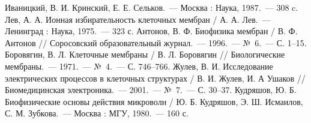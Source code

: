 \begin{thebibliography}{99}
    Иваницкий, В. И. Кринский, Е. Е. Сельков.~--- Москва : Наука, 1987.~---
    308 c.
 Лев, А. А. Ионная избирательность клеточных мембран /
    А. А. Лев.~--- Ленинград : Наука, 1975.~--- 323 с.
 Антонов, В. Ф. Биофизика мембран / В. Ф. Антонов // Соросовский
    образовательный журнал.~--- 1996.~--- №~6.~--- С. 1--15.
 Боровягин, В. Л. Клеточные мембраны / В. Л. Боровягин //
    Биологические мембраны.~--- 1971.~--- №~4.~--- С. 746--766.
 Жулев, В. И. Исследование электрических процессов в клеточных
    структурах / В. И. Жулев, И. А Ушаков // Биомедицинская электроника.~---
    2001.~--- №~7.~--- С. 30--37.
 Кудряшов, Ю. Б. Биофизические основы действия микроволн /
    Ю. Б. Кудряшов, Э. Ш. Исмаилов, С. М. Зубкова.~--- Москва : МГУ, 1980.~---
    160 с.
\end{thebibliography}
